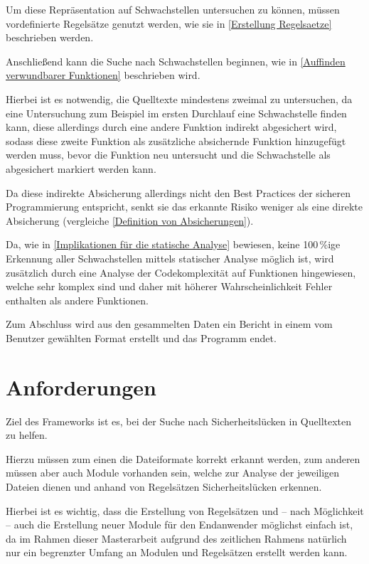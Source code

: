         Um diese Repräsentation auf Schwachstellen untersuchen zu können,
        müssen vordefinierte Regelsätze genutzt werden,
        wie sie in
        \vref{Erstellung Regelsaetze} beschrieben werden.

        Anschließend kann die Suche nach Schwachstellen beginnen,
        wie in
        \vref{Auffinden verwundbarer Funktionen} beschrieben wird.

        Hierbei ist es notwendig,
        die Quelltexte mindestens zweimal zu untersuchen,
        da eine Untersuchung zum Beispiel im ersten Durchlauf eine Schwachstelle finden kann,
        diese allerdings durch eine andere Funktion indirekt abgesichert wird,
        sodass diese zweite Funktion als zusätzliche absichernde Funktion hinzugefügt werden muss,
        bevor die Funktion neu untersucht und
        die Schwachstelle als abgesichert markiert werden kann.

        Da diese indirekte Absicherung allerdings nicht den Best Practices der sicheren Programmierung entspricht,
        senkt sie das erkannte Risiko weniger als eine direkte Absicherung
        (vergleiche
        \vref{Definition von Absicherungen}).

        Da,
        wie in
        \vref{Implikationen für die statische Analyse} bewiesen,
        keine 100\,\%ige Erkennung aller Schwachstellen mittels statischer Analyse möglich ist,
        wird zusätzlich durch eine Analyse der Codekomplexität auf Funktionen hingewiesen,
        welche sehr komplex sind und
        daher mit höherer Wahrscheinlichkeit Fehler enthalten als andere Funktionen.

        Zum Abschluss wird aus den gesammelten Daten ein Bericht in einem vom Benutzer gewählten Format erstellt und
        das Programm endet.

    \section{Anforderungen}
        Ziel des Frameworks ist es,
        bei der Suche nach Sicherheitslücken in Quelltexten zu helfen.

        Hierzu müssen zum einen die Dateiformate korrekt erkannt werden,
        zum anderen müssen aber auch Module vorhanden sein,
        welche zur Analyse der jeweiligen Dateien dienen und
        anhand von Regelsätzen Sicherheitslücken erkennen.

        Hierbei ist es wichtig,
        dass die Erstellung von Regelsätzen und
        -- nach Möglichkeit
        -- auch die Erstellung neuer Module für den Endanwender möglichst einfach ist,
        da im Rahmen dieser Masterarbeit aufgrund des zeitlichen Rahmens natürlich nur ein begrenzter Umfang an Modulen und
        Regelsätzen erstellt werden kann.

